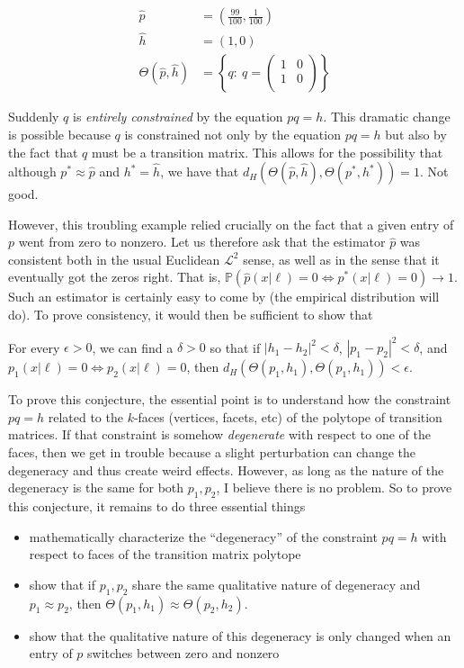 \begin{align*}
\hat p &= \left(\frac{99}{100}, \frac{1}{100}\right)\\
\hat h &= (1, 0)\\
\Theta(\hat p,\hat h) &= 
  \left\{q:\ q=\left(\begin{array}{cc}
  1 & 0 \\
  1 & 0 \\
  \end{array}\right)\right\}
\end{align*}

Suddenly $q$ is \emph{entirely constrained} by the equation $pq=h$.  This dramatic change is possible because $q$ is constrained not only by the equation $pq=h$ but also by the fact that $q$ must be a transition matrix.  This allows for the possibility that although $p^*\approx \hat p$ and $h^*=\hat h$, we have that $d_H(\Theta(\hat p,\hat h),\Theta(p^*,h^*))=1$.  Not good.

However, this troubling example relied crucially on the fact that a given entry of $p$ went from zero to nonzero.  Let us therefore ask that the estimator $\hat p$ was consistent both in the usual Euclidean $\mathscr L^2$ sense, as well as in the sense that it eventually got the zeros right.  That is, $\mathbb P(\hat p(x|\ell)=0\Leftrightarrow p^*(x|\ell)=0) \rightarrow 1$.  Such an estimator is certainly easy to come by (the empirical distribution will do).  To prove consistency, it would then be sufficient to show that

\vspace{.1in}
\begin{conj}
For every $\epsilon>0$, we can find a $\delta>0$ so that if $|h_1 -h_2|^2<\delta$, $|p_1 -p_2|^2<\delta$, and $p_1(x|\ell)=0\Leftrightarrow p_2(x|\ell)=0$, then $d_H(\Theta(p_1,h_1),\Theta(p_1,h_1))<\epsilon$.
\end{conj}

To prove this conjecture, the essential point is to understand how the constraint $pq=h$ related to the $k$-faces (vertices, facets, etc) of the polytope of transition matrices.  If that constraint is somehow \emph{degenerate} with respect to one of the faces, then we get in trouble because a slight perturbation can change the degeneracy and thus create weird effects.  However, as long as the nature of the degeneracy is the same for both $p_1,p_2$, I believe there is no problem.  So to prove this conjecture, it remains to do three essential things

\begin{itemize}
    \item mathematically characterize the ``degeneracy'' of the constraint $pq=h$ with respect to faces of the transition matrix polytope
    \item show that if $p_1,p_2$ share the same qualitative nature of degeneracy and $p_1\approx p_2$, then $\Theta(p_1,h_1)\approx\Theta(p_2,h_2)$.
    \item show that the qualitative nature of this degeneracy is only changed when an entry of $p$ switches between zero and nonzero
\end{itemize}

